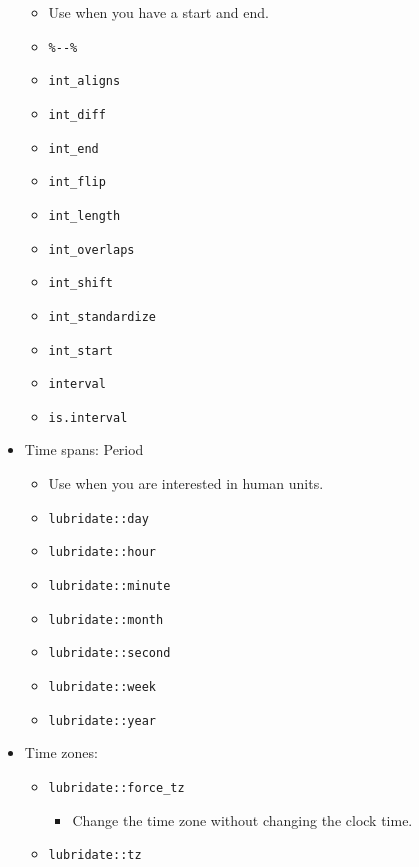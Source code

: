 \documentclass[
]{book}
\providecommand{\tightlist}{%
  \setlength{\itemsep}{0pt}\setlength{\parskip}{0pt}}
\begin{document}
\begin{itemize}
  \begin{itemize}
  \tightlist
  \item
    Use when you have a start and end.
  \item
    \texttt{\%-\/-\%}
  \item
    \texttt{int\_aligns}
  \item
    \texttt{int\_diff}
  \item
    \texttt{int\_end}
  \item
    \texttt{int\_flip}
  \item
    \texttt{int\_length}
  \item
    \texttt{int\_overlaps}
  \item
    \texttt{int\_shift}
  \item
    \texttt{int\_standardize}
  \item
    \texttt{int\_start}
  \item
    \texttt{interval}
  \item
    \texttt{is.interval}
  \end{itemize}
\item
  Time spans: Period

  \begin{itemize}
  \tightlist
  \item
    Use when you are interested in human units.
  \item
    \texttt{lubridate::day}
  \item
    \texttt{lubridate::hour}
  \item
    \texttt{lubridate::minute}
  \item
    \texttt{lubridate::month}
  \item
    \texttt{lubridate::second}
  \item
    \texttt{lubridate::week}
  \item
    \texttt{lubridate::year}
  \end{itemize}
\item
  Time zones:

  \begin{itemize}
  \tightlist
  \item
    \texttt{lubridate::force\_tz}

    \begin{itemize}
    \tightlist
    \item
      Change the time zone without changing the clock time.
    \end{itemize}
  \item
    \texttt{lubridate::tz}


\end{itemize}
\end{itemize}
\end{document}
